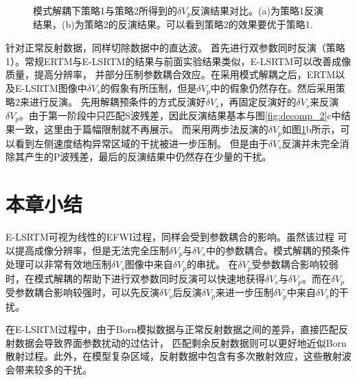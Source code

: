 \begin{figure}[!htb]
   \centering
   \caption{
   模式解耦下策略1与策略2所得到的$\delta
   V_p$反演结果对比。(a)为策略1反演结果，(b)为策略2的反演结果。可以看到策略2的效果要优于策略1.}
   \label{fig:final_comparison_2}
\end{figure}
针对正常反射数据，同样切除数据中的直达波。
首先进行双参数同时反演（策略1）。常规ERTM与E-LSRTM的结果与前面实验结果类似，E-LSRTM可以改善成像质量，提高分辨率，
并部分压制参数耦合效应。在采用模式解耦之后，ERTM以及E-LSRTM图像中$\delta
V_s$的假象有所压制，但是$\delta
V_p$中的假象仍然存在。然后采用策略2来进行反演。
先用解耦预条件的方式反演好$\delta V_s$，再固定反演好的$\delta V_s$来反演$\delta
V_p$。由于第一阶段中只匹配S波残差，因此反演结果基本与图\ref{fig:decomp_2}c中结果一致，这里由于篇幅限制就不再展示。
而采用两步法反演的$\delta
V_p$如图\ref{fig:final_comparison_2}b所示，可以看到左侧速度结构异常区域的干扰被进一步压制。
但是由于$\delta V_s$反演并未完全消除其产生的P波残差，最后的反演结果中仍然存在少量的干扰。
\section{本章小结}
E-LSRTM可视为线性的EFWI过程，同样会受到参数耦合的影响。虽然该过程
可以提高成像分辨率，但是无法完全压制$\delta V_p$与$\delta V_s$中的参数耦合。模式解耦的预条件处理可以非常有效地压制$\delta
V_s$图像中来自$\delta V_p$的串扰。
在$\delta V_p$受参数耦合影响较弱时，在模式解耦的帮助下进行双参数同时反演可以快速地获得$\delta
V_s$与$\delta V_p$。而在$\delta V_p$受参数耦合影响较强时，可以先反演$\delta V_s$后反演$\delta
V_p$来进一步压制$\delta V_p$中来自$\delta V_s$的干扰。

在E-LSRTM过程中，由于Born模拟数据与正常反射数据之间的差异，直接匹配反射数据会导致界面参数扰动的过估计，
匹配剩余反射数据则可以更好地近似Born散射过程。此外，在模型复杂区域，反射数据中包含有多次散射效应，这些散射波会带来较多的干扰。

